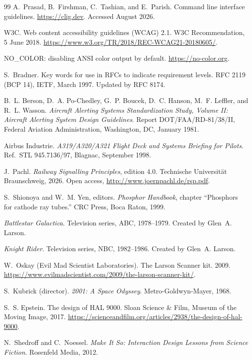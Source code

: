 \documentclass[11pt]{article}
\begin{document}
\begin{thebibliography}{99}
A.~Prasad, B.~Firshman, C.~Tashian, and E.~Parish.
Command line interface guidelines.
\url{https://clig.dev}. Accessed August 2026.

W3C.
Web content accessibility guidelines (WCAG) 2.1.
W3C Recommendation, 5 June 2018.
\url{https://www.w3.org/TR/2018/REC-WCAG21-20180605/}.

NO\_COLOR: disabling ANSI color output by default.
\url{https://no-color.org}.

S.~Bradner.
Key words for use in RFCs to indicate requirement levels.
RFC 2119 (BCP 14), IETF, March 1997.
Updated by RFC 8174.

B.~L. Berson, D.~A. Po-Chedley, G.~P. Boucek, D.~C. Hanson, M.~F.
Leffler, and R.~L. Wasson.
\emph{Aircraft Alerting Systems Standardization Study, Volume II:
Aircraft Alerting System Design Guidelines}.
Report DOT/FAA/RD-81/38/II, Federal Aviation Administration, Washington,
DC, January 1981.

Airbus Industrie.
\emph{A319/A320/A321 Flight Deck and Systems Briefing for Pilots}.
Ref.\ STL 945.7136/97, Blagnac, September 1998.

J.~Pachl.
\emph{Railway Signalling Principles}, edition 4.0.
Technische Universit\"at Braunschweig, 2026.
Open access, \url{http://www.joernpachl.de/rsp.pdf}.

S.~Shionoya and W.~M. Yen, editors.
\emph{Phosphor Handbook}, chapter ``Phosphors for cathode ray
tubes.'' CRC Press, Boca Raton, 1999.

\emph{Battlestar Galactica}.
Television series, ABC, 1978--1979. Created by Glen~A. Larson.

\emph{Knight Rider}.
Television series, NBC, 1982--1986. Created by Glen~A. Larson.

W.~Oskay (Evil Mad Scientist Laboratories).
The Larson Scanner kit.
2009.
\url{https://www.evilmadscientist.com/2009/the-larson-scanner-kit/}.

S.~Kubrick (director).
\emph{2001: A Space Odyssey}.
Metro-Goldwyn-Mayer, 1968.

S.~S. Epstein.
The design of HAL 9000.
Sloan Science \& Film, Museum of the Moving Image, 2017.
\url{https://scienceandfilm.org/articles/2938/the-design-of-hal-9000}.

N.~Shedroff and C.~Noessel.
\emph{Make It So: Interaction Design Lessons from Science Fiction}.
Rosenfeld Media, 2012.


\end{thebibliography}
\end{document}
